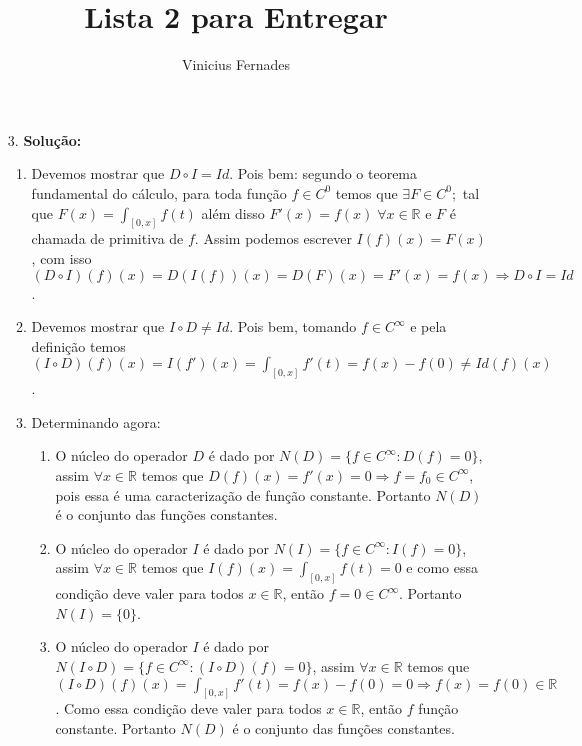 \documentclass{article}
\begin{document}
	
	\title{Lista 2 para Entregar}
	\author{Vinicius Fernades}
	
	\maketitle
	
	\begin{enumerate}
		\item[3.] \textbf{Solução:}
		\begin{enumerate}
			\item Devemos mostrar que $D\circ I = Id$. Pois bem: segundo o teorema fundamental do cálculo, para toda função $f  \in C^{0}$ temos que $\exists F \in C^{0}; $ tal que $ F(x) = \int_{[0,x]}f(t)$ além disso $F'(x) = f(x) \; \forall x \in \mathbb{R}$ e $F$ é chamada de primitiva de $f$. Assim podemos escrever $I(f)(x) = F(x)$, com isso $(D\circ I)(f)(x) = D(I(f))(x) = D(F)(x) = F'(x) = f(x) \Rightarrow D\circ I = Id$.
			
			\item Devemos mostrar que $I \circ D \neq Id$. Pois bem, tomando $f \in C^{\infty}$ e pela definição temos $(I \circ D) (f)(x) = I(f')(x) = \int_{[0,x]}f'(t) = f(x)-f(0) \neq Id(f)(x)$.
			
			\item Determinando agora:
				\begin{enumerate}
					\item O núcleo do operador $D$ é dado por $N(D)=\{f \in C^{\infty}: D(f)=0 \}$, assim $\forall x  \in \mathbb{R}$ temos que $D(f)(x) = f'(x) =0 \Rightarrow f = f_{0} \in C^{\infty}$, pois essa é uma caracterização de função constante. Portanto $N(D)$ é o conjunto das funções constantes.
					
					\item O núcleo do operador $I$ é dado por $N(I)=\{f \in C^{\infty}: I(f)=0 \}$, assim $\forall x  \in \mathbb{R}$ temos que $I(f)(x) = \int_{[0,x]}f(t) =0$ e como essa condição deve valer para todos $x \in \mathbb{R}$, então $f = 0 \in C^{\infty}$. Portanto $N(I) = \{0\}$.
					
					\item O núcleo do operador $I$ é dado por $N(I\circ D)=\{f \in C^{\infty}: (I\circ D)(f)=0 \}$, assim $\forall x  \in \mathbb{R}$ temos que $ (I\circ D)(f)(x) = \int_{[0,x]}f'(t) = f(x) - f(0) = 0 \Rightarrow f(x) = f(0) \in \mathbb{R}$. Como essa condição deve valer para todos $x \in \mathbb{R}$, então $f$ função constante. Portanto $N(D)$ é o conjunto das funções constantes.
				\end{enumerate}
		\end{enumerate}
		

\end{enumerate}
\end{document}
